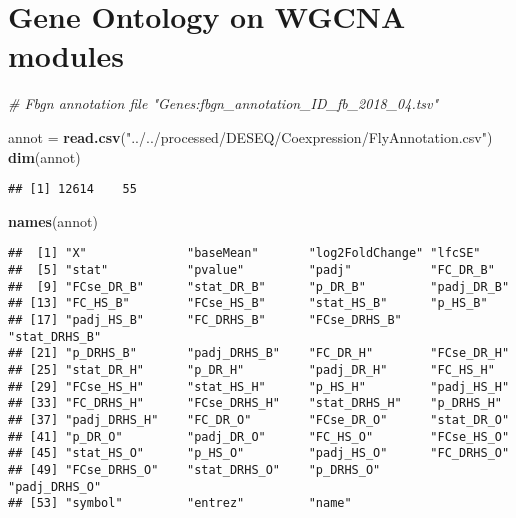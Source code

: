 \documentclass[]{article}
\newenvironment{Shaded}{\begin{snugshade}}{\end{snugshade}}
\newcommand{\CommentTok}[1]{\textcolor[rgb]{0.56,0.35,0.01}{\textit{#1}}}
\newcommand{\KeywordTok}[1]{\textcolor[rgb]{0.13,0.29,0.53}{\textbf{#1}}}
\newcommand{\NormalTok}[1]{#1}
\newcommand{\OperatorTok}[1]{\textcolor[rgb]{0.81,0.36,0.00}{\textbf{#1}}}
\newcommand{\StringTok}[1]{\textcolor[rgb]{0.31,0.60,0.02}{#1}}
\begin{document}
\begin{Shaded}
\end{Shaded}

\hypertarget{gene-ontology-on-wgcna-modules}{%
\section{Gene Ontology on WGCNA
modules}\label{gene-ontology-on-wgcna-modules}}

\begin{Shaded}
\begin{Highlighting}[]
\CommentTok{# Fbgn annotation file "Genes:fbgn_annotation_ID_fb_2018_04.tsv"}

\NormalTok{annot =}\StringTok{ }\KeywordTok{read.csv}\NormalTok{(}\StringTok{"../../processed/DESEQ/Coexpression/FlyAnnotation.csv"}\NormalTok{)}
\KeywordTok{dim}\NormalTok{(annot)}
\end{Highlighting}
\end{Shaded}

\begin{verbatim}
## [1] 12614    55
\end{verbatim}

\begin{Shaded}
\begin{Highlighting}[]
\KeywordTok{names}\NormalTok{(annot)}
\end{Highlighting}
\end{Shaded}

\begin{verbatim}
##  [1] "X"              "baseMean"       "log2FoldChange" "lfcSE"         
##  [5] "stat"           "pvalue"         "padj"           "FC_DR_B"       
##  [9] "FCse_DR_B"      "stat_DR_B"      "p_DR_B"         "padj_DR_B"     
## [13] "FC_HS_B"        "FCse_HS_B"      "stat_HS_B"      "p_HS_B"        
## [17] "padj_HS_B"      "FC_DRHS_B"      "FCse_DRHS_B"    "stat_DRHS_B"   
## [21] "p_DRHS_B"       "padj_DRHS_B"    "FC_DR_H"        "FCse_DR_H"     
## [25] "stat_DR_H"      "p_DR_H"         "padj_DR_H"      "FC_HS_H"       
## [29] "FCse_HS_H"      "stat_HS_H"      "p_HS_H"         "padj_HS_H"     
## [33] "FC_DRHS_H"      "FCse_DRHS_H"    "stat_DRHS_H"    "p_DRHS_H"      
## [37] "padj_DRHS_H"    "FC_DR_O"        "FCse_DR_O"      "stat_DR_O"     
## [41] "p_DR_O"         "padj_DR_O"      "FC_HS_O"        "FCse_HS_O"     
## [45] "stat_HS_O"      "p_HS_O"         "padj_HS_O"      "FC_DRHS_O"     
## [49] "FCse_DRHS_O"    "stat_DRHS_O"    "p_DRHS_O"       "padj_DRHS_O"   
## [53] "symbol"         "entrez"         "name"
\end{verbatim}
\end{document}
